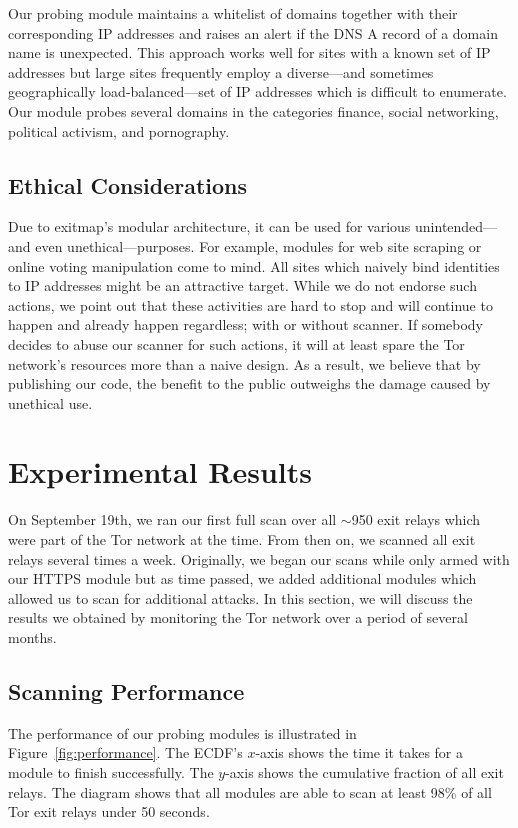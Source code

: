 \documentclass[letterpaper,twocolumn,10pt]{article}
\begin{document}
Our probing module maintains a whitelist of domains together with their corresponding IP addresses
and raises an alert if the DNS A record of a domain name is unexpected.  This approach works well
for sites with a known set of IP addresses but large sites frequently employ a diverse---and
sometimes geographically load-balanced---set of IP addresses which is difficult to enumerate.  Our
module probes several domains in the categories finance, social networking, political activism, and
pornography.



\subsection{Ethical Considerations}
Due to \textsf{exitmap}'s modular architecture, it can be used for various unintended---and even
unethical---purposes.  For example, modules for web site scraping or online voting manipulation come
to mind.  All sites which naively bind identities to IP addresses might be an attractive target.
While we do not endorse such actions, we point out that these activities are hard to stop and will
continue to happen and already happen regardless; with or without scanner.  If somebody decides to
abuse our scanner for such actions, it will at least spare the Tor network's resources more than a
naive design.  As a result, we believe that by publishing our code, the benefit to the public
outweighs the damage caused by unethical use.

\section{Experimental Results}
\label{sec:results}
On September 19th, we ran our first full scan over all $\sim$950 exit relays which were part of the
Tor network at the time. From then on, we scanned all exit relays several times a week.  Originally,
we began our scans while only armed with our HTTPS module but as time passed, we added additional
modules which allowed us to scan for additional attacks.  In this section, we will discuss the
results we obtained by monitoring the Tor network over a period of several months.

\subsection{Scanning Performance}
The performance of our probing modules is illustrated in Figure~\ref{fig:performance}.  The ECDF's
$x$-axis shows the time it takes for a module to finish successfully.  The $y$-axis shows the
cumulative fraction of all exit relays.  The diagram shows that all modules are able to scan at
least 98\% of all Tor exit relays  under 50 seconds.
\end{document}
